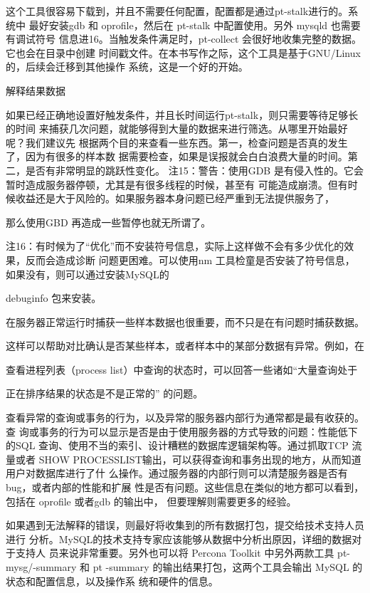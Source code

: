 {这个工具很容易下载到，并且不需要任何配置，配置都是通过pt-stalk进行的。系统中
最好安装gdb 和 oprofile，然后在 pt-stalk 中配置使用。另外 mysqld 也需要有调试符号
信息进16。当触发条件满足时，pt-collect 会很好地收集完整的数据。它也会在目录中创建
时间戳文件。在本书写作之际，这个工具是基于GNU/Linux 的，后续会迁移到其他操作
系统，这是一个好的开始。

解释结果数据

如果已经正确地设置好触发条件，并且长时间运行pt-stalk，则只需要等待足够长的时间
来捕获几次问题，就能够得到大量的数据来进行筛选。从哪里开始最好呢？我们建议先
根据两个目的来查看一些东西。第一，检查问题是否真的发生了，因为有很多的样本数
据需要检查，如果是误报就会白白浪费大量的时间。第二，是否有非常明显的跳跃性变化。
注15：警告：使用GDB 是有侵入性的。它会暂时造成服务器停顿，尤其是有很多线程的时候，甚至有
可能造成崩溃。但有时候收益还是大于风险的。如果服务器本身问题已经严重到无法提供服务了，

那么使用GBD 再造成一些暂停也就无所谓了。

注16：有时候为了“优化”而不安装符号信息，实际上这样做不会有多少优化的效果，反而会造成诊断
问题更困难。可以使用nm 工具检童是否安装了符号信息，如果没有，则可以通过安装MySQL的

debuginfo 包来安装。

在服务器正常运行时捕获一些样本数据也很重要，而不只是在有问题时捕获数据。

这样可以帮助对比确认是否某些样本，或者样本中的某部分数据有异常。例如，在

查看进程列表（process list）中查询的状态时，可以回答一些诸如“大量查询处于

正在排序结果的状态是不是正常的” 的问题。

查看异常的查询或事务的行为，以及异常的服务器内部行为通常都是最有收获的。查
询或事务的行为可以显示是否是由于使用服务器的方式导致的问题：性能低下的SQL
查询、使用不当的索引、设计糟糕的数据库逻辑架构等。通过抓取TCP 流量或者 SHOW
PROCESSLIST输出，可以获得查询和事务出现的地方，从而知道用户对数据库进行了什
么操作。通过服务器的内部行则可以清楚服务器是否有bug，或者内部的性能和扩展
性是否有问题。这些信息在类似的地方都可以看到，包括在 oprofile 或者gdb 的输出中，
但要理解则需要更多的经验。

如果遇到无法解释的错误，则最好将收集到的所有数据打包，提交给技术支持人员进行
分析。MySQL的技术支持专家应该能够从数据中分析出原因，详细的数据对于支持人
员来说非常重要。另外也可以将 Percona Toolkit 中另外两款工具 pt-mysg/-summary 和 pt
-summary 的输出结果打包，这两个工具会输出 MySQL 的状态和配置信息，以及操作系
统和硬件的信息。

}

